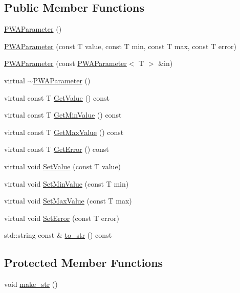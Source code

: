 \subsection*{Public Member Functions}
\begin{DoxyCompactItemize}
\item 
\hyperlink{classPWAParameter_a4be4f99ee7b087966625af22b6724d2b}{PWAParameter} ()
\item 
\hyperlink{classPWAParameter_a1fd9d62e6e6d9665fa8f50a01ea44e08}{PWAParameter} (const T value, const T min, const T max, const T error)
\item 
\hyperlink{classPWAParameter_a26d29b6f5db20ce28bffb4f8f51f103d}{PWAParameter} (const \hyperlink{classPWAParameter}{PWAParameter}$<$ T $>$ \&in)
\item 
virtual \hyperlink{classPWAParameter_abe9cf9e35dd365263bab2ba448417320}{$\sim$PWAParameter} ()
\item 
virtual const T \hyperlink{classPWAParameter_aeb63b119db2a408ba1a69b057458e476}{GetValue} () const 
\item 
virtual const T \hyperlink{classPWAParameter_ad56bff0ec385ebc123f980fd932b7679}{GetMinValue} () const 
\item 
virtual const T \hyperlink{classPWAParameter_ae2cf7ce619f8539dd2d54fb836fc6881}{GetMaxValue} () const 
\item 
virtual const T \hyperlink{classPWAParameter_afa71b91326c07eadcc832928d21fcc1c}{GetError} () const 
\item 
virtual void \hyperlink{classPWAParameter_a5b0aeb09e7f770c8196d5afc08f59320}{SetValue} (const T value)
\item 
virtual void \hyperlink{classPWAParameter_abd0ed2ea7347c9a74eb2f9f1a0871198}{SetMinValue} (const T min)
\item 
virtual void \hyperlink{classPWAParameter_a2681d68a47e40c4226e7eee63dca985a}{SetMaxValue} (const T max)
\item 
virtual void \hyperlink{classPWAParameter_add37911ceeaddfaa2e4b8a2ce7ca5947}{SetError} (const T error)
\item 
std::string const \& \hyperlink{classPWAParameter_aaea7aaa18a729118f0fcb75ef2fdbb8c}{to\_\-str} () const 
\end{DoxyCompactItemize}
\subsection*{Protected Member Functions}
\begin{DoxyCompactItemize}
\item 
void \hyperlink{classPWAParameter_ad61ee62933b2b6b8edf73efde8e8e71b}{make\_\-str} ()
\end{DoxyCompactItemize}
